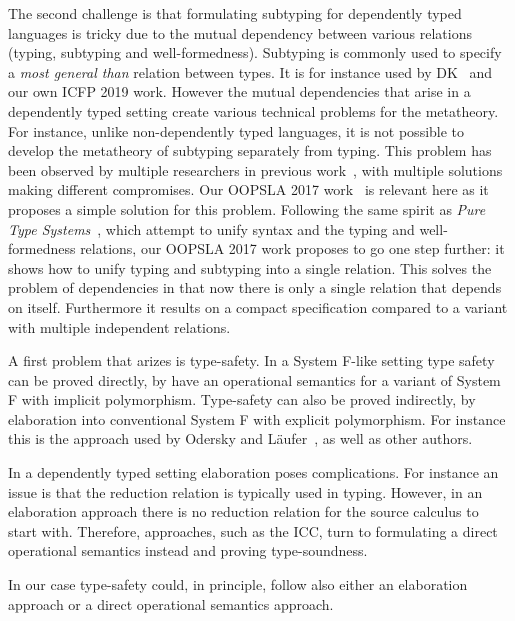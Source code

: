 The second challenge is that formulating subtyping for dependently typed
languages is tricky due to the mutual dependency between various relations
(typing, subtyping and well-formedness). Subtyping is commonly used to
specify a \emph{most general than} relation between types. It
is for instance used by DK~\cite{dunfield2013complete} and our own ICFP 2019 work. 
However the mutual dependencies that arise in a dependently typed setting create
various technical problems for the metatheory.
For instance, unlike non-dependently typed languages, it is
not possible to develop the metatheory of subtyping separately from typing. 
This problem has been observed by multiple researchers 
in previous work~\cite{subdep,Chen03coc,hutchins,ptssub}, with multiple solutions making different compromises.
Our OOPSLA 2017 work~\cite{full} is relevant here as it proposes a simple
solution for this problem. Following the same spirit as \emph{Pure Type Systems}~\cite{BarendregtHP:intgts},
which attempt to unify syntax and the typing and well-formedness relations,
our OOPSLA 2017 work proposes to go one step further: it shows how to unify typing
and subtyping into a single relation. This solves the problem of dependencies
in that now there is only a single relation that depends on itself. Furthermore
it results on a compact specification compared to a variant with multiple
independent relations.


A first problem that arizes is type-safety. 
In a System F-like setting type safety can be proved 
directly, by have an operational semantics for
a variant of System F with implicit polymorphism.
Type-safety can also be proved indirectly, by elaboration
into conventional System F with explicit polymorphism.
For instance this is the approach used by Odersky and L\"aufer~\cite{},
as well as other authors.

In a dependently typed setting elaboration poses
complications. For instance an issue is that the reduction
relation is typically used in typing. However, in an elaboration
approach there is no reduction relation for the source calculus
to start with. Therefore, approaches, such as the ICC, turn to
formulating a direct operational semantics instead and proving
type-soundness. 

In our case type-safety could, in principle, follow also either an elaboration
approach or a direct operational semantics approach. 


